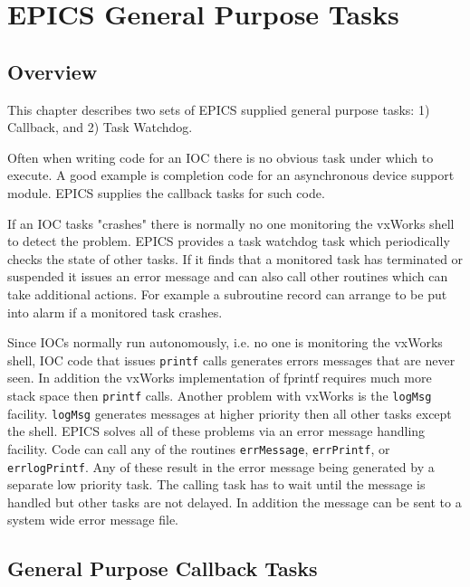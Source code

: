 





\chapter{EPICS General Purpose Tasks}

\section{Overview}

This chapter describes two sets of EPICS supplied general purpose tasks: 1) Callback,  and 2) Task Watchdog.

Often when writing code for an IOC there is no obvious task under which to execute. A good example is completion code 
for an asynchronous device support module. EPICS supplies the callback tasks for such code.

If an IOC tasks "crashes" there is normally no one monitoring the vxWorks shell to detect the problem. EPICS provides a 
task watchdog task which periodically checks the state of other tasks. If  it finds that a monitored task has terminated or 
suspended it issues an error message and can also call other routines which can take additional actions. For example a 
subroutine record can arrange to be put into alarm if a monitored task crashes.

Since IOCs normally run autonomously, i.e. no one is monitoring the vxWorks shell, IOC code that issues \verb|printf| calls 
generates errors messages that are never seen. In addition the vxWorks implementation of fprintf requires much more 
stack space then \verb|printf| calls. Another problem with vxWorks is the \verb|logMsg| facility. \verb|logMsg| generates messages at 
higher priority then all other tasks except the shell. EPICS solves all of these problems via an error message handling 
facility. Code can call any of the routines \verb|errMessage|, \verb|errPrintf|, or \verb|errlogPrintf|. Any of these result in the 
error message being generated by a separate low priority task. The calling task has to wait until the message is handled but 
other tasks are not delayed. In addition the message can be sent to a system wide error message file.

\section{General Purpose Callback Tasks}

